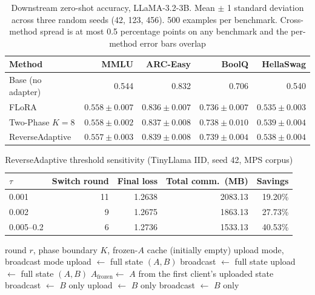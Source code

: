 \documentclass[pdflatex,sn-nature]{sn-jnl}
\begin{document}
\begin{table}[bp]
\centering
\footnotesize
\setlength{\tabcolsep}{6pt}
\caption{Downstream zero-shot accuracy, LLaMA-3.2-3B. Mean $\pm$ 1 standard deviation across three random seeds (42, 123, 456). 500 examples per benchmark. Cross-method spread is at most 0.5 percentage points on any benchmark and the per-method error bars overlap}
\label{tab:downstream_llama}
\begin{tabular}{@{}lrrrr@{}}
\toprule
Method & MMLU & ARC-Easy & BoolQ & HellaSwag \\
\midrule
Base (no adapter) & 0.544 & 0.832 & 0.706 & 0.540 \\
FLoRA             & $0.558 \pm 0.007$ & $0.836 \pm 0.007$ & $0.736 \pm 0.007$ & $0.535 \pm 0.003$ \\
Two-Phase $K{=}8$ & $0.558 \pm 0.002$ & $0.837 \pm 0.008$ & $0.738 \pm 0.010$ & $0.539 \pm 0.004$ \\
ReverseAdaptive   & $0.557 \pm 0.003$ & $0.839 \pm 0.008$ & $0.739 \pm 0.004$ & $0.538 \pm 0.004$ \\
\bottomrule
\end{tabular}
\end{table}


\begin{table}[tbp]
\centering
\footnotesize
\setlength{\tabcolsep}{6pt}
\caption{ReverseAdaptive threshold sensitivity (TinyLlama IID, seed 42, MPS corpus)}
\label{tab:ablation}
\begin{tabular}{@{}lrrrr@{}}
\toprule
$\tau$ & Switch round & Final loss & Total comm.\ (MB) & Savings \\
\midrule
0.001 & 11 & 1.2638 & 2083.13 & 19.20\% \\
0.002 & 9  & 1.2675 & 1863.13 & 27.73\% \\
0.005--0.2 & 6  & 1.2736 & 1533.13 & 40.53\% \\
\bottomrule
\end{tabular}
\end{table}


\begin{algorithm}[t]
\centering
\caption{Bidirectional B-only protocol (server, per round)}
\label{alg:bonly}
\footnotesize
\begin{algorithmic}[1]
\Require round $r$, phase boundary $K$, frozen-$A$ cache (initially empty)
\Ensure upload mode, broadcast mode
 
    \State upload $\leftarrow$ full state $(A, B)$
    \State broadcast $\leftarrow$ full state
 
    \State upload $\leftarrow$ full state $(A, B)$
    \State $A_{\text{frozen}} \leftarrow$ $A$ from the first client's uploaded state
    \State broadcast $\leftarrow$ $B$ only 
\Else {}
    \State upload $\leftarrow$ $B$ only 
    \State broadcast $\leftarrow$ $B$ only 
\EndIf
\end{algorithmic}
\end{algorithm}
\end{document}
